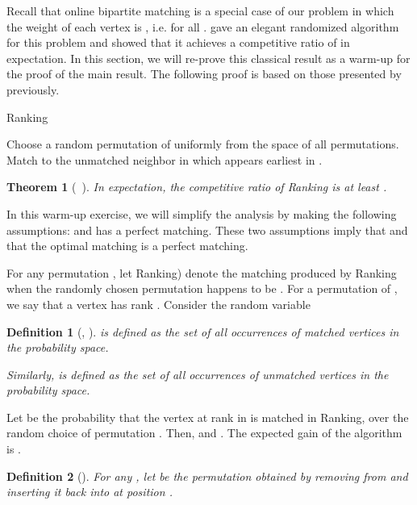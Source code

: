 \documentclass[11pt]{article}
\newtheorem{theorem}{Theorem}
\newtheorem{definition}{Definition}
\begin{document}
Recall that online bipartite matching is a special case of our problem
in which the weight of each vertex is , i.e.  for all .  \cite{KVV90} gave an elegant randomized algorithm for this
problem and showed that it achieves a competitive ratio of 
in expectation. In this section, we will re-prove this classical result
as a warm-up for the proof of the main result. The following proof is
based on those presented by \cite{BM08,GM08} previously.

\vspace{0.1in}

\begin{algorithm}[H]
\caption{{\sc Ranking}}
Choose a random permutation  of  uniformly from the space of all permutations.\\
{
	Match  to the unmatched neighbor in  which appears earliest in .\\
}
\end{algorithm}

\begin{theorem}[~\cite{KVV90}]
\label{thm:kvv}
In expectation, the competitive ratio of {\sc Ranking} is at least .
\end{theorem}

In this warm-up exercise, we will simplify the analysis by making the following assumptions:  and  has a perfect matching. These two assumptions imply that  and that the optimal matching  is a perfect matching.

For any permutation , let {\sc Ranking}) denote the
matching produced by {\sc Ranking} when the randomly chosen
permutation happens to be .
For a permutation  of , we say that
a vertex  has rank . 
Consider the random variable 


\begin{definition}[, ]
 is defined as the set of all occurrences of matched vertices
  in the probability space.

Similarly,  is defined as the set of all occurrences of unmatched vertices
in the probability space.

\end{definition}

Let  be the probability that the vertex at rank  in 
is matched in {\sc Ranking}, over the random choice of
permutation . Then,  and
. The expected gain of the algorithm is
.


\begin{definition}[]
For any , let
 be the permutation obtained by removing  from 
and inserting it back into  at position .
\end{definition}
\end{document}
